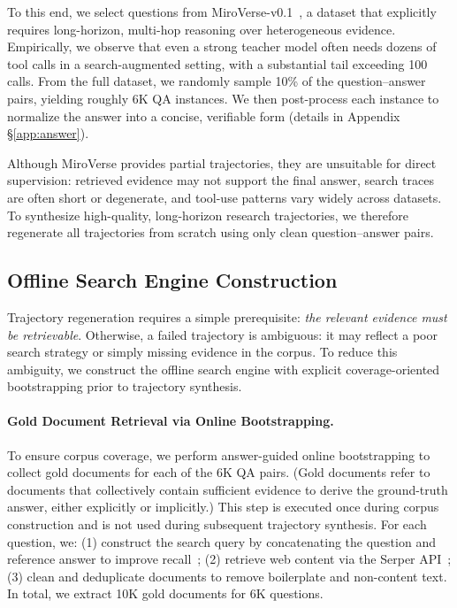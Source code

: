 To this end, we select questions from MiroVerse-v0.1~\citep{miromind2025mirothinker}, a dataset that explicitly requires long-horizon, multi-hop reasoning over heterogeneous evidence. 
Empirically, we observe that even a strong teacher model often needs dozens of tool calls in a search-augmented setting, with a substantial tail exceeding 100 calls.
From the full dataset, we randomly sample 10\% of the question--answer pairs, yielding roughly 6K QA instances. We then post-process each instance to normalize the answer into a concise, verifiable form (details in Appendix \S\ref{app:answer}).


Although MiroVerse provides partial trajectories, they are unsuitable for direct supervision: retrieved evidence may not support the final answer, search traces are often short or degenerate, and tool-use patterns vary widely across datasets. To synthesize high-quality, long-horizon research trajectories, we therefore regenerate all trajectories from scratch using only clean question–answer pairs. 



\subsection{Offline Search Engine Construction}
\label{subsec:offline_search}
Trajectory regeneration requires a simple prerequisite: \textit{the relevant evidence must be retrievable}. Otherwise, a failed trajectory is ambiguous: it may reflect a poor search strategy or simply missing evidence in the corpus. To reduce this ambiguity, we construct the offline search engine with explicit coverage-oriented bootstrapping prior to trajectory synthesis.


\paragraph{Gold Document Retrieval via Online Bootstrapping.}
To ensure corpus coverage, we perform answer-guided online bootstrapping to collect gold documents for each of the 6K QA pairs. (Gold documents refer to documents that collectively contain sufficient evidence to derive the ground-truth answer, either explicitly or implicitly.) This step is executed once during corpus construction and is not used during subsequent trajectory synthesis.
For each question, we: 
(1) construct the search query by concatenating the question and reference answer to improve recall~\citep{azad2019query};
(2) retrieve web content via the Serper API~\citep{serperdev2026}; 
(3) clean and deduplicate documents to remove boilerplate and non-content text. In total, we extract 10K gold documents for 6K questions.

